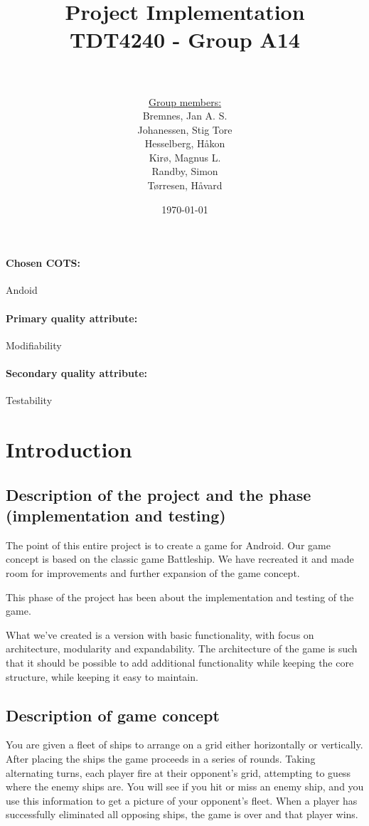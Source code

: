 \documentclass[12pt, a4paper]{article}
\title{
	Project Implementation \\
    TDT4240 - Group A14 \\
	~\\
}
\author{
	\underline{Group members:} \\
    Bremnes, Jan A. S.\\
    Johanessen, Stig Tore\\
	Hesselberg, Håkon \\
    Kirø, Magnus L.\\
	Randby, Simon \\
    Tørresen, Håvard\\
}
\date{\today}
\begin{document}
\maketitle
\paragraph{Chosen COTS:} Andoid
\paragraph{Primary quality attribute:} Modifiability
\paragraph{Secondary quality attribute:} Testability \\


\newpage
\tableofcontents
\newpage

\section{Introduction}

\subsection{Description of the project and the phase (implementation and
testing)}

The point of this entire project is to create a game for Android. Our game
concept is based on the classic game Battleship. We have recreated it and made
room for improvements and further expansion of the game concept. 

This phase of the project has been about the implementation and testing of the
game.

What we’ve created is a version with basic functionality, with focus on
architecture, modularity and expandability. The architecture of the game is such
that it should be possible to add additional functionality while keeping the
core structure, while keeping it easy to maintain.

\subsection{Description of game concept}
You are given a fleet of ships to arrange on a grid either horizontally or
vertically. After placing the ships the game proceeds in a series of rounds.
Taking alternating turns, each player fire at their opponent’s grid, attempting
to guess where the enemy ships are. You will see if you hit or miss an enemy
ship, and you use this information to get a picture of your opponent’s fleet.
When a player has successfully eliminated all opposing ships, the game is over
and that player wins.
\end{document}
